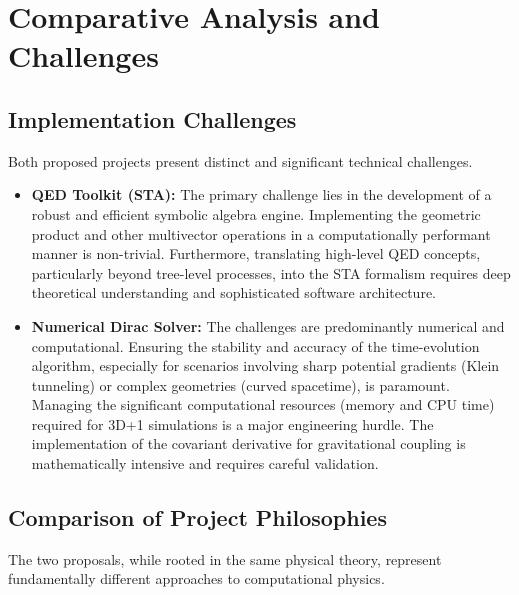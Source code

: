 \documentclass[11pt, letterpaper]{article}
\theoremstyle{definition}
\theoremstyle{remark}
\begin{document}
\section{Comparative Analysis and Challenges}

\subsection{Implementation Challenges}
Both proposed projects present distinct and significant technical challenges.
\begin{itemize}
	\item \textbf{QED Toolkit (STA):} The primary challenge lies in the
		development of a robust and efficient symbolic algebra engine. Implementing
		the geometric product and other multivector operations in a computationally
		performant manner is non-trivial. Furthermore, translating high-level QED
		concepts, particularly beyond tree-level processes, into the STA formalism
		requires deep theoretical understanding and sophisticated software
		architecture.
	\item \textbf{Numerical Dirac Solver:} The challenges are predominantly
		numerical and computational. Ensuring the stability and accuracy of the
		time-evolution algorithm, especially for scenarios involving sharp potential
		gradients (Klein tunneling) or complex geometries (curved spacetime), is
		paramount. Managing the significant computational resources (memory and CPU
		time) required for 3D+1 simulations is a major engineering hurdle. The
		implementation of the covariant derivative for gravitational coupling is
		mathematically intensive and requires careful validation.
\end{itemize}

\subsection{Comparison of Project Philosophies}
The two proposals, while rooted in the same physical theory, represent
fundamentally different approaches to computational physics.
\end{document}
